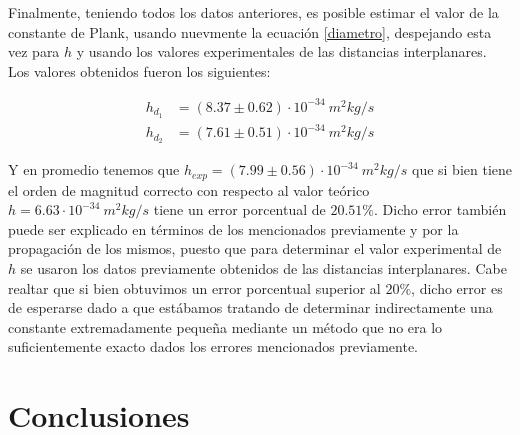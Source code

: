 \documentclass[prb,aps,twocolumn,preprintnumbers,amsmath,amssymb]{revtex4}
\begin{document}
Finalmente, teniendo todos los datos anteriores, es posible estimar el valor de la constante de Plank, usando nuevmente la ecuación \eqref{diametro}, despejando esta vez para $h$ y usando los valores experimentales de las distancias interplanares. Los valores obtenidos fueron los siguientes:

\begin{equation}
\label{plank}
\begin{split}
h_{d_{1}} &= (8.37 \pm 0.62) \cdot 10^{-34}\ m^2kg/s\\
h_{d_{2}} &= (7.61 \pm 0.51) \cdot 10^{-34}\ m^2kg/s
\end{split}
\end{equation}

Y en promedio tenemos que $h_{exp} = (7.99 \pm 0.56) \cdot 10^{-34}\ m^2kg/s$ que si bien tiene el orden de magnitud correcto con respecto al valor teórico $h = 6.63 \cdot 10^{-34}\ m^2kg/s$ tiene un error porcentual de $20.51\%$. Dicho error también puede ser explicado en términos de los mencionados previamente y por la propagación de los mismos, puesto que para determinar el valor experimental de $h$ se usaron los datos previamente obtenidos de las distancias interplanares. Cabe realtar que si bien obtuvimos un error porcentual superior al $20\%$, dicho error es de esperarse dado a que estábamos tratando de determinar indirectamente una constante extremadamente pequeña mediante un método que no era lo suficientemente exacto dados los errores mencionados previamente.

\section{Conclusiones}
\end{document}
